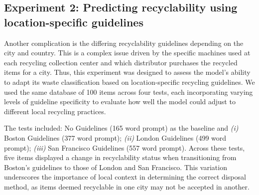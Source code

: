 \documentclass{article}
\begin{document}


\subsection{Experiment 2: Predicting recyclability using location-specific guidelines}
Another complication is the differing recyclability guidelines depending on the city and country. This is a complex issue driven by the specific machines used at each recycling collection center and which distributor purchases the recycled items for a city. Thus, this experiment was designed to assess the model’s ability to adapt its waste classification based on location-specific recycling guidelines. We used the same database of 100 items across four tests, each incorporating varying levels of guideline specificity to evaluate how well the model could adjust to different local recycling practices.

The tests included: No Guidelines (165 word prompt) as the baseline and \textit{(i)} Boston Guidelines (377 word prompt); \textit{(ii)} London Guidelines (499 word prompt); \textit{(iii)} San Francisco Guidelines (557 word prompt). Across these tests, five items displayed a change in recyclability status when transitioning from Boston’s guidelines to those of London and San Francisco. This variation underscores the importance of local context in determining the correct disposal method, as items deemed recyclable in one city may not be accepted in another. %
\end{document}
